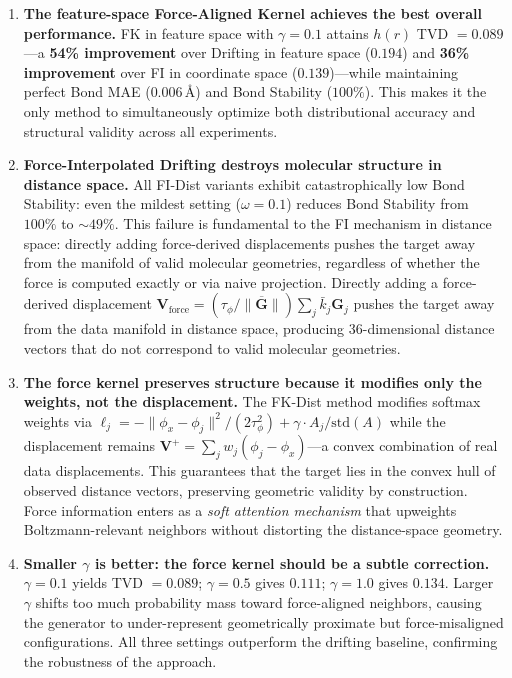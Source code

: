 \documentclass[11pt]{article}
\newcommand{\bV}{\mathbf{V}}
\newcommand{\bG}{\mathbf{G}}
\newcommand{\kbar}{\bar{k}}
\begin{document}
\begin{enumerate}
    \item \textbf{The feature-space Force-Aligned Kernel achieves the best overall performance.}
    FK in feature space with $\gamma = 0.1$ attains $h(r)$ TVD $= 0.089$---a \textbf{54\% improvement} over Drifting in feature space ($0.194$) and \textbf{36\% improvement} over FI in coordinate space ($0.139$)---while maintaining perfect Bond MAE ($0.006$\,\AA) and Bond Stability ($100\%$).
    This makes it the only method to simultaneously optimize both distributional accuracy and structural validity across all experiments.

    \item \textbf{Force-Interpolated Drifting destroys molecular structure in distance space.}
    All FI-Dist variants exhibit catastrophically low Bond Stability: even the mildest setting ($\omega = 0.1$) reduces Bond Stability from $100\%$ to ${\sim}49\%$.
    This failure is fundamental to the FI mechanism in distance space: directly adding force-derived displacements pushes the target away from the manifold of valid molecular geometries, regardless of whether the force is computed exactly or via naive projection.
    Directly adding a force-derived displacement $\bV_{\text{force}} = (\tau_\phi / \overline{\|\bG\|})\sum_j \kbar_j \bG_j$ pushes the target away from the data manifold in distance space, producing 36-dimensional distance vectors that do not correspond to valid molecular geometries.

    \item \textbf{The force kernel preserves structure because it modifies only the weights, not the displacement.}
    The FK-Dist method modifies softmax weights via $\ell_j = -\|\phi_x - \phi_j\|^2/(2\tau_\phi^2) + \gamma \cdot A_j/\text{std}(A)$ while the displacement remains $\bV^+ = \sum_j w_j(\phi_j - \phi_x)$---a convex combination of real data displacements.
    This guarantees that the target lies in the convex hull of observed distance vectors, preserving geometric validity by construction.
    Force information enters as a \emph{soft attention mechanism} that upweights Boltzmann-relevant neighbors without distorting the distance-space geometry.

    \item \textbf{Smaller $\gamma$ is better: the force kernel should be a subtle correction.}
    $\gamma = 0.1$ yields TVD $= 0.089$; $\gamma = 0.5$ gives $0.111$; $\gamma = 1.0$ gives $0.134$.
    Larger $\gamma$ shifts too much probability mass toward force-aligned neighbors, causing the generator to under-represent geometrically proximate but force-misaligned configurations.
    All three settings outperform the drifting baseline, confirming the robustness of the approach.


\end{enumerate}
\end{document}
